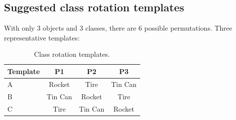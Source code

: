 \documentclass[a4]{article}
\begin{document}
\subsection*{Suggested class rotation templates}

With only 3 objects and 3 classes, there are 6 possible permutations. Three representative templates:

\begin{table}[H]
\centering
\begin{tabular}{lccc}
\toprule
\textbf{Template} & \textbf{P1} & \textbf{P2} & \textbf{P3} \\
\midrule
A & Rocket & Tire & Tin Can \\
B & Tin Can & Rocket & Tire \\
C & Tire & Tin Can & Rocket \\
\bottomrule
\end{tabular}
\caption{Class rotation templates.}
\end{table}
\end{document}
